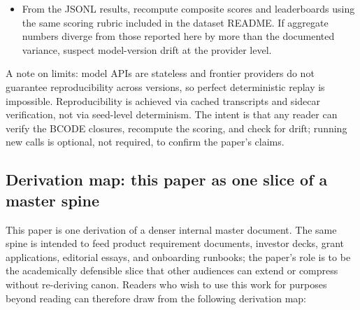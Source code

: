 \begin{enumerate}
  \begin{itemize}
  \tightlist
  \item
    From the JSONL results, recompute composite scores and leaderboards
    using the same scoring rubric included in the dataset README. If
    aggregate numbers diverge from those reported here by more than the
    documented variance, suspect model-version drift at the provider
    level.
  \end{itemize}
\end{enumerate}

A note on limits: model APIs are stateless and frontier providers do not
guarantee reproducibility across versions, so perfect deterministic
replay is impossible. Reproducibility is achieved via cached transcripts
and sidecar verification, not via seed-level determinism. The intent is
that any reader can verify the BCODE closures, recompute the scoring,
and check for drift; running new calls is optional, not required, to
confirm the paper's claims.

\subsection{Derivation map: this paper as one slice of a master
spine}\label{derivation-map-this-paper-as-one-slice-of-a-master-spine}

This paper is one derivation of a denser internal master document. The
same spine is intended to feed product requirement documents, investor
decks, grant applications, editorial essays, and onboarding runbooks;
the paper's role is to be the academically defensible slice that other
audiences can extend or compress without re-deriving canon. Readers who
wish to use this work for purposes beyond reading can therefore draw
from the following derivation map:

